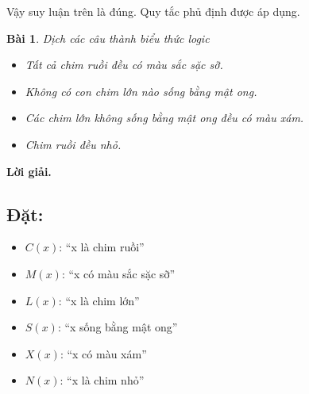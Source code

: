 \documentclass[11pt, oneside,openright,a4paper]{book}
\newtheorem{bt}{Bài }[section]
\begin{document}
Vậy suy luận trên là đúng. Quy tắc phủ định được áp dụng.

\begin{bt}
 Dịch các câu thành biểu thức logic
 \begin{itemize}
 \item[a)] Tất cả chim ruồi đều có màu sắc sặc sỡ.
 \item[b)] Không có con chim lớn nào sống bằng mật ong.
 \item[c)] Các chim lớn không sống bằng mật ong đều có màu xám.
 \item[d)] Chim ruồi đều nhỏ.
 \end{itemize}
\end{bt}

{\bf Lời giải.} 

\subsection*{Đặt:}
\begin{itemize}
    \item $C(x)$: ``x là chim ruồi''
    \item $M(x)$: ``x có màu sắc sặc sỡ''
    \item $L(x)$: ``x là chim lớn''
    \item $S(x)$: ``x sống bằng mật ong''
    \item $X(x)$: ``x có màu xám''
    \item $N(x)$: ``x là chim nhỏ''
\end{itemize}
\end{document}
